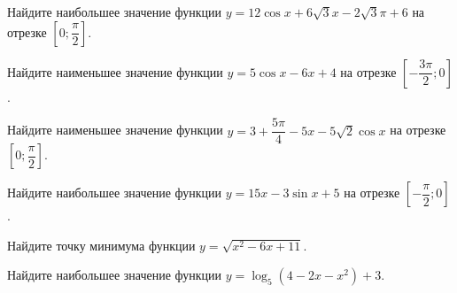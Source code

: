 \begin{class}[number=9]
	\begin{listofex}
		\item Найдите наибольшее значение функции \( y=12\cos x + 6\sqrt{3} x - 2 \sqrt{3} \pi + 6 \) на отрезке \( \left[ 0; \dfrac{ \pi }{ 2 } \right]  \).
		\item Найдите наименьшее значение функции \(y=5 \cos x - 6x + 4 \) на отрезке \( \left[ -\dfrac{ 3\pi }{ 2 }; 0 \right] \).
		\item Найдите наименьшее значение функции \(y=3+\dfrac{ 5\pi }{ 4 } -5x - 5\sqrt{2} \cos x \) на отрезке \( \left[ 0; \dfrac{ \pi }{ 2 } \right] \).
		\item Найдите наибольшее значение функции \( y=15x-3\sin x +5 \) на отрезке \( \left[ -\dfrac{ \pi }{ 2 }; 0 \right] \).
		\item Найдите точку минимума функции \( y=\sqrt{x^2-6x+11} \).
		\item Найдите наибольшее значение функции \( y=\log_5 (4-2x-x^2)+3 \).

\end{listofex}
\end{class}
